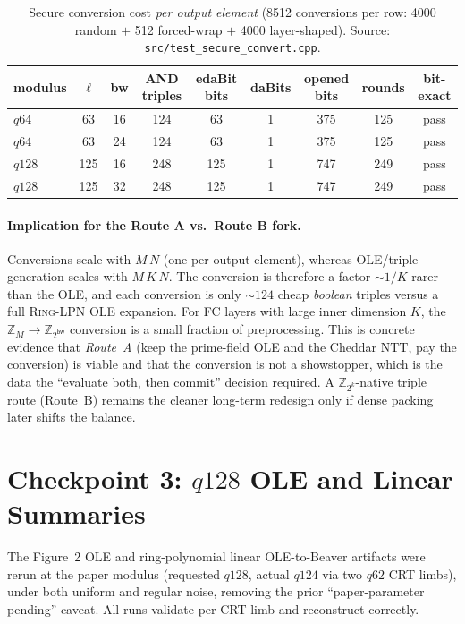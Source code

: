 \documentclass[11pt]{article}
\newcommand{\Z}{\mathbb{Z}}
\newcommand{\modtwo}{\Z_{2^{\mathsf{bw}}}}
\newcommand{\RingLPN}{\textsc{Ring-LPN}}
\begin{document}
\begin{table}[h]
\centering\small
\begin{tabular}{lcccccccc}
\toprule
modulus & $\ell$ & bw & AND triples & edaBit bits & daBits & opened bits & rounds & bit-exact \\
\midrule
$q64$  & 63  & 16 & 124 & 63  & 1 & 375 & 125 & pass \\
$q64$  & 63  & 24 & 124 & 63  & 1 & 375 & 125 & pass \\
$q128$ & 125 & 16 & 248 & 125 & 1 & 747 & 249 & pass \\
$q128$ & 125 & 32 & 248 & 125 & 1 & 747 & 249 & pass \\
\bottomrule
\end{tabular}
\caption{Secure conversion cost \emph{per output element} (8512 conversions per
row: 4000 random $+$ 512 forced-wrap $+$ 4000 layer-shaped). Source:
\texttt{src/test\_secure\_convert.cpp}.}
\label{tab:convert}
\end{table}

\paragraph{Implication for the Route A vs.\ Route B fork.} Conversions scale with
$M\,N$ (one per output element), whereas OLE/triple generation scales with
$M\,K\,N$. The conversion is therefore a factor $\sim\!1/K$ rarer than the OLE,
and each conversion is only $\sim\!124$ cheap \emph{boolean} triples versus a full
\RingLPN{} OLE expansion. For FC layers with large inner dimension $K$, the
$\Z_M\!\to\!\modtwo$ conversion is a small fraction of preprocessing. This is
concrete evidence that \emph{Route~A} (keep the prime-field OLE and the Cheddar
NTT, pay the conversion) is viable and that the conversion is not a showstopper,
which is the data the ``evaluate both, then commit'' decision required. A
$\Z_{2^k}$-native triple route (Route~B) remains the cleaner long-term redesign
only if dense packing later shifts the balance.

\section{Checkpoint 3: $q128$ OLE and Linear Summaries}
\label{sec:q128}

The Figure~2 OLE and ring-polynomial linear OLE-to-Beaver artifacts were rerun at
the paper modulus (requested $q128$, actual $q124$ via two $q62$ CRT limbs),
under both uniform and regular noise, removing the prior ``paper-parameter
pending'' caveat. All runs validate per CRT limb and reconstruct correctly.
\end{document}
